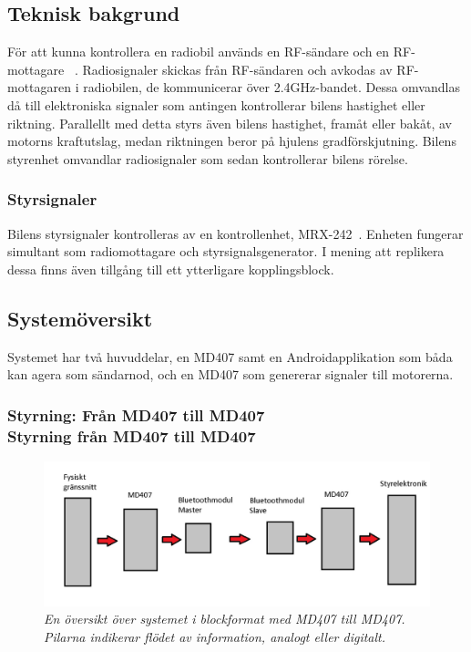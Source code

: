 \documentclass[a4paper]{article}
\begin{document}
\subsection{Teknisk bakgrund}
För att kunna kontrollera en radiobil används en RF-sändare och en RF-mottagare ~\cite{RCTechnique}. Radiosignaler skickas från RF-sändaren och avkodas av RF-mottagaren i radiobilen, de kommunicerar över 2.4GHz-bandet. Dessa omvandlas då till elektroniska signaler som antingen kontrollerar bilens hastighet eller riktning. Parallellt med detta styrs även bilens hastighet, framåt eller bakåt, av motorns kraftutslag, medan riktningen beror på hjulens gradförskjutning. Bilens styrenhet omvandlar radiosignaler som sedan kontrollerar bilens rörelse.

\subsubsection{Styrsignaler}
Bilens styrsignaler kontrolleras av en kontrollenhet, MRX-242~\cite{projektDir}. Enheten fungerar simultant som radiomottagare och styrsignalsgenerator. I mening att replikera dessa finns även tillgång till ett ytterligare kopplingsblock.


\subsection{Systemöversikt}
Systemet har två huvuddelar, en MD407 samt en Androidapplikation som båda kan agera som sändarnod, och en MD407 som genererar signaler till motorerna.

\subsubsection{Styrning: Från MD407 till MD407 \\ Styrning från MD407 till MD407}
\begin{figure}[H]
\includegraphics[width=\textwidth]{systemoversikt.jpg}
\centering
\caption{\it En översikt över systemet i blockformat med MD407 till MD407. Pilarna indikerar flödet av information, analogt eller digitalt.}
\end{figure} 
\end{document}
